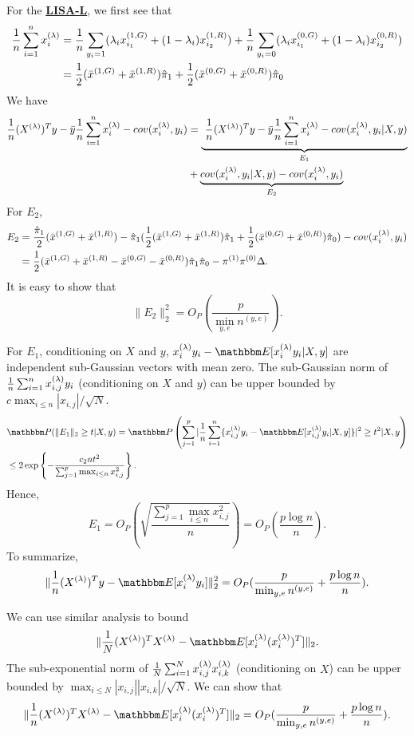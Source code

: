 For the \underline{\textbf{LISA-L}}, we first see that
\begin{align*}
  \frac{1}{n}\sum_{i=1}^nx^{(\lambda)}_i&=\frac{1}{n}\sum_{y_i=1}(\lambda_i x_{i_1}^{(1,G)}+(1-\lambda_i)x_{i_2}^{(1,R)})+\frac{1}{n}\sum_{y_i=0}(\lambda_i x_{i_1}^{(0,G)}+(1-\lambda_i)x_{i_2}^{(0,R)})\\
  &=\frac{1}{2}(\bar{x}^{(1,G)}+\bar{x}^{(1,R)})\hat{\pi}_1+\frac{1}{2}(\bar{x}^{(0,G)}+\bar{x}^{(0,R)})\hat{\pi}_0
\end{align*}
We have
\begin{align*}
    \frac{1}{n}(X^{(\lambda)})^Ty- \bar{y}\frac{1}{n}\sum_{i=1}^nx^{(\lambda)}_i-cov(x_i^{(\lambda)},y_i)&=\underbrace{\    \frac{1}{n}(X^{(\lambda)})^Ty- \bar{y}\frac{1}{n}\sum_{i=1}^nx^{(\lambda)}_i-cov(x_i^{(\lambda)},y_i|X,y)}_{E_1}\\&+\underbrace{cov(x_i^{(\lambda)},y_i|X,y)-cov(x_i^{(\lambda)},y_i)}_{E_2}
\end{align*}
For $E_2$,
\begin{align*}
    E_2&=\frac{\hat{\pi}_1}{2}(\bar{x}^{(1,G)}+\bar{x}^{(1,R)})-\hat{\pi}_1(\frac{1}{2}(\bar{x}^{(1,G)}+\bar{x}^{(1,R)})\hat{\pi}_1+\frac{1}{2}(\bar{x}^{(0,G)}+\bar{x}^{(0,R)})\hat{\pi}_0)-cov(x_i^{(\lambda)},y_i)\\
    &=\frac{1}{2}(\bar{x}^{(1,G)}+\bar{x}^{(1,R)}-\bar{x}^{(0,G)}-\bar{x}^{(0,R)})\hat{\pi}_1\hat{\pi}_0-\pi^{(1)}\pi^{(0)}\Delta.
\end{align*}
It is easy to show that
\[
  \|E_2\|_2^2=O_P\left(\frac{p}{\min_{y,e}n^{(y,e)}}\right).
\]

For $E_1$, conditioning on $X$ and $y$, $x_i^{(\lam)}y_i-\E[x_i^{(\lam)}y_i|X,y]$ are independent sub-Gaussian vectors with mean zero. The sub-Gaussian norm of $\frac{1}{n}\sum_{i=1}^nx_{i,j}^{(\lambda)}y_i$ (conditioning on $X$ and $y$) can be upper bounded by $c\max_{i\leq n} |x_{i,j}|/\sqrt{N}$.
\begin{align*}
   &\P( \|E_1\|_2\geq t|X,y)=\P\left(\sum_{j=1}^p|\frac{1}{n}\sum_{i=1}^n\{x_{i,j}^{(\lam)}y_i-\E[x_{i,j}^{(\lam)}y_i|X,y]\}|^2\geq t^2|X,y\right)\\
   &\leq 2\exp\left\{-\frac{c_2nt^2}{\sum_{j=1}^p\max_{i\leq n}x_{i,j}^2}\right\}.
\end{align*}
Hence,
\[
  E_1=O_P(\sqrt{\frac{\sum_{j=1}^p\max_{i\leq n}x_{i,j}^2}{n}})=O_P(\frac{p\log n}{n}).
\]
To summarize,
\[
  \|\frac{1}{n}(X^{(\lam)})^Ty-\E[x_i^{(\lam)}y_i]\|_2^2=O_P(\frac{p}{\min_{y,e}n^{(y,e)}}+\frac{p\log n}{n}).
\]

We can use similar analysis to bound
\[
 \|\frac{1}{N}(X^{(\lam)})^TX^{(\lam)}-\E[x_i^{(\lam)}(x_i^{(\lam)})^T]\|_2.
\]
The sub-exponential norm of $\frac{1}{N}\sum_{i=1}^Nx_{i,j}^{(\lambda)}x_{i,k}^{(\lambda)}$ (conditioning on $X$) can be upper bounded by $\max_{i\leq N}|x_{i,j}||x_{i,k}|/\sqrt{N}$.
We can show that
\begin{align*}
  \|\frac{1}{n}(X^{(\lam)})^TX^{(\lam)}-\E[x_i^{(\lam)}(x_i^{(\lam)})^T]\|_2=O_P(\frac{p}{\min_{y,e}n^{(y,e)}}+\frac{p\log n}{n}).
\end{align*}


